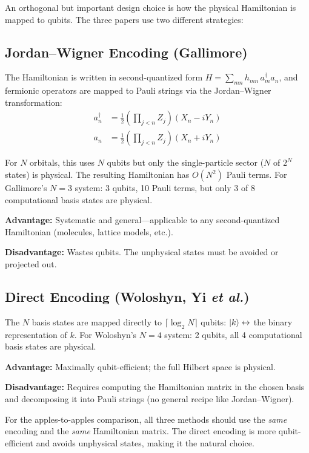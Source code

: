 \documentclass[11pt,a4paper]{article}
\begin{document}
An orthogonal but important design choice is how the physical Hamiltonian
is mapped to qubits.  The three papers use two different strategies:

\subsection{Jordan--Wigner Encoding (Gallimore)}

The Hamiltonian is written in second-quantized form
$H = \sum_{mn} h_{mn}\,a_m^\dagger a_n$, and fermionic operators are mapped
to Pauli strings via the Jordan--Wigner transformation:
\begin{align}
  a_n^\dagger &= \frac{1}{2}\!\left(\prod_{j<n}Z_j\right)(X_n - iY_n) \\
  a_n &= \frac{1}{2}\!\left(\prod_{j<n}Z_j\right)(X_n + iY_n)
\end{align}

For $N$ orbitals, this uses $N$ qubits but only the single-particle sector
($N$ of $2^N$ states) is physical.  The resulting Hamiltonian has $O(N^2)$
Pauli terms.  For Gallimore's $N=3$ system: 3 qubits, 10 Pauli terms, but
only 3 of 8 computational basis states are physical.

\textbf{Advantage:} Systematic and general---applicable to any
second-quantized Hamiltonian (molecules, lattice models, etc.).

\textbf{Disadvantage:} Wastes qubits.  The unphysical states must be avoided
or projected out.

\subsection{Direct Encoding (Woloshyn, Yi \emph{et al.})}

The $N$ basis states are mapped directly to $\lceil\log_2 N\rceil$ qubits:
$\ket{k} \leftrightarrow$ the binary representation of $k$.  For Woloshyn's
$N=4$ system: 2 qubits, all 4 computational basis states are physical.

\textbf{Advantage:} Maximally qubit-efficient; the full Hilbert space is
physical.

\textbf{Disadvantage:} Requires computing the Hamiltonian matrix in the
chosen basis and decomposing it into Pauli strings (no general recipe like
Jordan--Wigner).

\begin{keybox}
For the apples-to-apples comparison, all three methods should use the
\emph{same} encoding and the \emph{same} Hamiltonian matrix.  The direct
encoding is more qubit-efficient and avoids unphysical states, making it
the natural choice.
\end{keybox}
\end{document}
